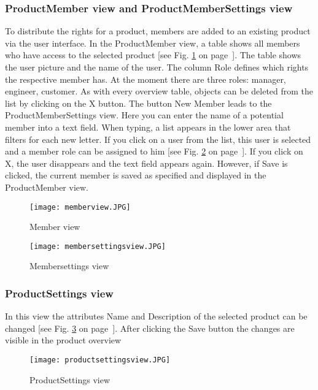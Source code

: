     \subsubsection*{ProductMember view and ProductMemberSettings view}
    To distribute the rights for a product, members are added to an existing product via the user interface. In the ProductMember view, a table shows all members who have access to the selected product [see Fig. \ref{fig: memberview} on page~\pageref{fig: memberview}]. The table shows the user picture and the name of the user. The column Role defines which rights the respective member has. At the moment there are three roles: manager, engineer, customer. As with every overview table, objects can be deleted from the list by clicking on the X button. The button New Member leads to the ProductMemberSettings view. Here you can enter the name of a potential member into a text field. When typing, a list appears in the lower area that filters for each new letter. If you click on a user from the list, this user is selected and a member role can be assigned to him [see Fig. \ref{fig: membersettingsview} on page~\pageref{fig: membersettingsview}]. If you click on X, the user disappears and the text field appears again. However, if Save is clicked, the current member is saved as specified and displayed in the ProductMember view.
    
    \begin{figure}[h]
        \centering
        \texttt{[image: memberview.JPG]}
        \caption{Member view}
        \label{fig: memberview}
    \end{figure}

    \begin{figure}[h]
        \centering
        \texttt{[image: membersettingsview.JPG]}
        \caption{Membersettings view}
        \label{fig: membersettingsview}
    \end{figure}

    \subsubsection*{ProductSettings view}
    In this view the attributes Name and Description of the selected product can be changed [see Fig. \ref{fig: productsettingsview} on page~\pageref{fig: productsettingsview}]. After clicking the Save button the changes are visible in the product overview
    \begin{figure}[h]
        \centering
        \texttt{[image: productsettingsview.JPG]}
        \caption{ProductSettings view}
        \label{fig: productsettingsview}
    \end{figure}